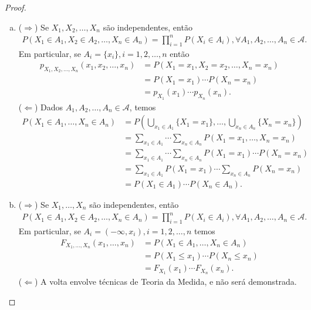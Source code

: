 \documentclass[../Notas.tex]{subfiles}
\begin{document}
\begin{proof}
\begin{enumerate}[(a)]
    \item ($\Rightarrow$) Se $X_1, X_2, \dots, X_n$ são independentes, então
    \begin{align*}
        P(X_1\in A_1, X_2\in A_2, \dots, X_n\in A_n) = \prod_{i=1}^{n}P(X_i\in A_i), \forall A_1, A_2, \dots, A_n\in\mathcal{A}.
    \end{align*}
    Em particular, se $A_i=\{x_i\}, i=1,2,\dots,n$ então
    \begin{align*}
        p_{X_1, X_2, \dots, X_n}(x_1, x_2, \dots, x_n) &= P(X_1=x_1, X_2=x_2, \dots, X_n=x_n) \\
        &= P(X_1=x_1)\cdots P(X_n=x_n) \\
        &= p_{X_1}(x_1)\cdots p_{X_n}(x_n).
    \end{align*}
    ($\Leftarrow$) Dados $A_1, A_2, \dots, A_n\in\mathcal{A}$, temos
    \begin{align*}
        P(X_1\in A_1, \dots, X_n\in A_n) &= P\left( \bigcup_{x_1\in A_1}\{X_1=x_1\}, \dots, \bigcup_{x_n\in A_n}\{X_n=x_n\} \right) \\
        &= \sum_{x_1\in A_1}\cdots\sum_{x_n\in A_n}P(X_1=x_1, \dots, X_n=x_n) \\
        &= \sum_{x_1\in A_1}\cdots\sum_{x_n\in A_n}P(X_1=x_1)\cdots P(X_n=x_n) \\
        &= \sum_{x_1\in A_1}P(X_1=x_1)\cdots\sum_{x_n\in A_n}P(X_n=x_n) \\
        &= P(X_1\in A_1)\cdots P(X_n\in A_n).
    \end{align*}
    \item ($\Rightarrow$) Se $X_1, \dots, X_n$ são independentes, então
    \begin{align*}
        P(X_1\in A_1, X_2\in A_2, \dots, X_n\in A_n) = \prod_{i=1}^{n}P(X_i\in A_i), \forall A_1, A_2, \dots, A_n\in\mathcal{A}.
    \end{align*}
    Em particular, se $A_i=(-\infty, x_i), i=1,2,\dots,n$ temos
    \begin{align*}
        F_{X_1, \dots, X_n}(x_1, \dots, x_n) &= P(X_1\in A_1, \dots, X_n\in A_n) \\
        &= P(X_1\leq x_1)\cdots P(X_n\leq x_n) \\
        &= F_{X_1}(x_1)\cdots F_{X_n}(x_n).
    \end{align*}
    ($\Leftarrow$) A volta envolve técnicas de Teoria da Medida, e não será demonstrada.
\end{enumerate}
\end{proof}
\end{document}
